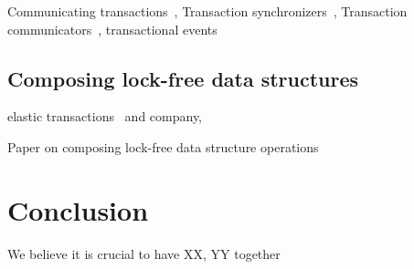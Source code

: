 \documentclass[preprint]{sigplanconf}
\begin{document}
Communicating transactions~\cite{Lesani2011}, 
Transaction synchronizers~\cite{Luchangco2005},
Transaction communicators~\cite{Luchangco2011},
transactional events~\cite{Donnelly2006}

\subsection{Composing lock-free data structures}

elastic transactions~\cite{Felber2009} and company, 

Paper on composing lock-free data structure operations~\cite{Cederman2010}

\section{Conclusion}

We believe it is crucial to have XX, YY together




\end{document}
